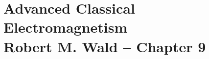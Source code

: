 \documentclass[english, 11pt]{book}
\begin{document}
\part{Advanced Classical Electromagnetism\\{\normalsize Robert M. Wald -- Chapter 9}}

%



\backmatter%
%
\printindex

\end{document}

